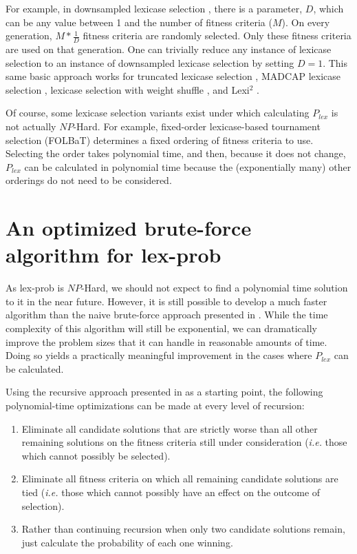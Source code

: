 \documentclass[sigconf]{acmart}
\begin{document}
For example, in downsampled lexicase selection \citep{hernandez_random_2019, ferguson_characterizing_2020}, there is a parameter, $D$, which can be any value between 1 and the number of fitness criteria ($M$). On every generation, $M*\frac{1}{D}$ fitness criteria are randomly selected. Only these fitness criteria are used on that generation. One can trivially reduce any instance of lexicase selection to an instance of downsampled lexicase selection by setting $D=1$. This same basic approach works for truncated lexicase selection \citep{spector_relaxations_2018}, MADCAP lexicase selection \citep{spector_relaxations_2018}, lexicase selection with weight shuffle \citep{troise_lexicase_2018}, and Lexi$^2$ \citep{de_lima_lexi_2022}. 

Of course, some lexicase selection variants exist under which calculating $P_{lex}$ is not actually $NP$-Hard. For example, fixed-order lexicase-based tournament selection (FOLBaT) \citep{burks_investigation_2018, troise_lexicase_2018} determines a fixed ordering of fitness criteria to use. Selecting the order takes polynomial time, and then, because it does not change, $P_{lex}$ can be calculated in polynomial time because the (exponentially many) other orderings do not need to be considered.


\section{An optimized brute-force algorithm for {\sc lex-prob}}
\label{sec:optimized}

As {\sc lex-prob} is $NP$-Hard, we should not expect to find a polynomial time solution to it in the near future. However, it is still possible to develop a much faster algorithm than the naive brute-force approach presented in \citep{la_cava_probabilistic_2018}. While the time complexity of this algorithm will still be exponential, we can dramatically improve the problem sizes that it can handle in reasonable amounts of time. Doing so yields a practically meaningful improvement in the cases where $P_{lex}$ can be calculated.

Using the recursive approach presented in \citep{la_cava_probabilistic_2018} as a starting point, the following polynomial-time optimizations can be made at every level of recursion:

\begin{enumerate}
    \item Eliminate all candidate solutions that are strictly worse than all other remaining solutions on the fitness criteria still under consideration (\textit{i.e.} those which cannot possibly be selected).
    \item Eliminate all fitness criteria on which all remaining candidate solutions are tied (\textit{i.e.} those which cannot possibly have an effect on the outcome of selection).
    \item Rather than continuing recursion when only two candidate solutions remain, just calculate the probability of each one winning. 
\end{enumerate}
\end{document}
